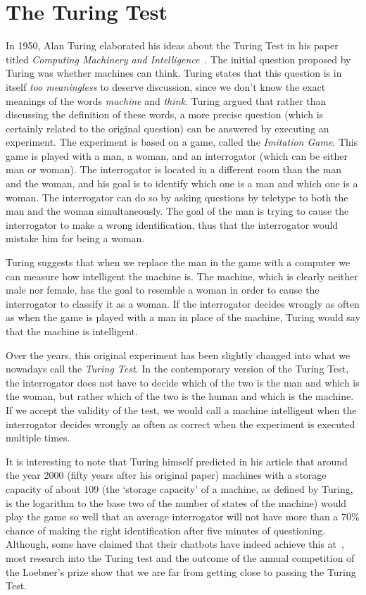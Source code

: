 \section{The Turing Test}
In 1950, Alan Turing elaborated his ideas about the Turing Test in his paper titled \textit{Computing Machinery and Intelligence}~\cite{turing1950computing}. The initial question proposed by Turing was whether machines can think. Turing states that this question is in itself \textit{too meaningless} to deserve discussion, since we don't know the exact meanings of the words \textit{machine} and \textit{think}. Turing argued that rather than discussing the definition of these words, a more precise question (which is certainly related to the original question) can be answered by executing an experiment. The experiment is based on a game, called the \textit{Imitation Game}. This game is played with a man, a woman, and an interrogator (which can be either man or woman). The interrogator is located in a different room than the man and the woman, and his goal is to identify which one is a man and which one is a woman. The interrogator can do so by asking questions by teletype to both the man and the woman simultaneously. The goal of the man is trying to cause the interrogator to make a wrong identification, thus that the interrogator would mistake him for being a woman.

Turing suggests that when we replace the man in the game with a computer we can measure how intelligent the machine is. The machine, which is clearly neither male nor female, has the goal to resemble a woman in order to cause the interrogator to classify it as a woman. If the interrogator decides wrongly as often as when the game is played with a man in place of the machine, Turing would say that the machine is intelligent.

Over the years, this original experiment has been slightly changed into what we nowadays call the \textit{Turing Test}. In the contemporary version of the Turing Test, the interrogator does not have to decide which of the two is the man and which is the woman, but rather which of the two is the human and which is the machine. If we accept the validity of the test, we would call a machine intelligent when the interrogator decides wrongly as often as correct when the experiment is executed multiple times.

It is interesting to note that Turing himself predicted in his article that around the year 2000 (fifty years after his original paper) machines with a storage capacity of about 109 (the ‘storage capacity’ of a machine, as defined by Turing, is the logarithm to the base two of the number of states of the machine) would play the game so well that an average interrogator will not have more than a 70\% chance of making the right identification after five minutes of questioning. Although, some have claimed that their chatbots have indeed achieve this at~\cite{copeland2014eugene}, most research into the Turing test and the outcome of the annual competition of the Loebner's prize show that we are far from getting close to passing the Turing Test.
